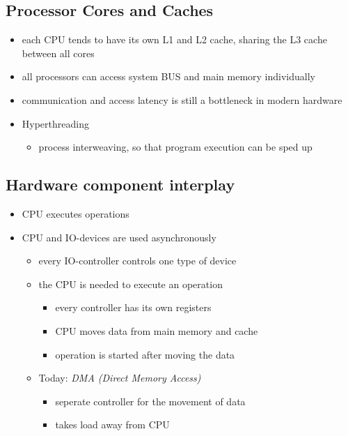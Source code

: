 \documentclass[
]{article}
\providecommand{\tightlist}{%
  \setlength{\itemsep}{0pt}\setlength{\parskip}{0pt}}
\begin{document}
\hypertarget{processor-cores-and-caches}{%
\subsection{Processor Cores and
Caches}\label{processor-cores-and-caches}}

\begin{itemize}
\item
  each CPU tends to have its own L1 and L2 cache, sharing the L3 cache
  between all cores
\item
  all processors can access system BUS and main memory individually
\item
  communication and access latency is still a bottleneck in modern
  hardware
\item
  Hyperthreading

  \begin{itemize}
  \tightlist
  \item
    process interweaving, so that program execution can be sped up
  \end{itemize}
\end{itemize}

\hypertarget{hardware-component-interplay}{%
\subsection{Hardware component
interplay}\label{hardware-component-interplay}}

\begin{itemize}
\tightlist
\item
  CPU executes operations
\item
  CPU and IO-devices are used asynchronously

  \begin{itemize}
  \tightlist
  \item
    every IO-controller controls one type of device
  \item
    the CPU is needed to execute an operation

    \begin{itemize}
    \tightlist
    \item
      every controller has its own registers
    \item
      CPU moves data from main memory and cache
    \item
      operation is started after moving the data
    \end{itemize}
  \item
    Today: \emph{DMA (Direct Memory Access)}

    \begin{itemize}
    \tightlist
    \item
      seperate controller for the movement of data
    \item
      takes load away from CPU
    \end{itemize}
  \end{itemize}
\end{itemize}
\end{document}
